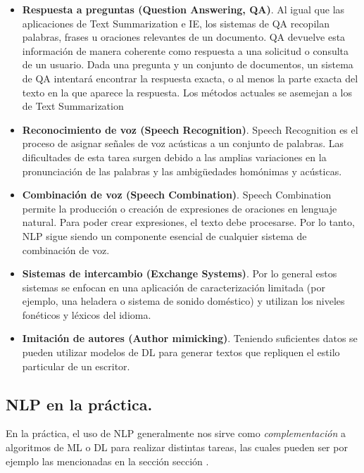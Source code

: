 \documentclass[12pt,a4paper]{article}
\begin{document}
\begin{sloppypar}
\begin{itemize}
\item \textbf{Respuesta a preguntas (Question Answering, QA)}. Al igual que las aplicaciones de Text Summarization e IE, los sistemas de QA recopilan palabras, frases u oraciones relevantes de un documento. QA devuelve esta información de manera coherente como respuesta a una solicitud o consulta de un usuario. Dada una pregunta y un conjunto de documentos, un sistema de QA intentará encontrar la respuesta exacta, o al menos la parte exacta del texto en la que aparece la respuesta. Los métodos actuales se asemejan a los de Text Summarization

\item \textbf{Reconocimiento de voz (Speech Recognition)}. Speech Recognition es el proceso de asignar señales de voz acústicas a un conjunto de palabras. Las dificultades de esta tarea surgen debido a las amplias variaciones en la pronunciación de las palabras y las ambigüedades homónimas y acústicas.

\item \textbf{Combinación de voz (Speech Combination)}. Speech Combination permite la producción o creación de expresiones de oraciones en lenguaje natural. Para poder crear expresiones, el texto debe procesarse. Por lo tanto, NLP sigue siendo un componente esencial de cualquier sistema de combinación de voz.

\item \textbf{Sistemas de intercambio (Exchange Systems)}. Por lo general estos sistemas se enfocan en una aplicación de caracterización limitada (por ejemplo, una heladera o sistema de sonido doméstico) y utilizan los niveles fonéticos y léxicos del idioma. 

\item \textbf{Imitación de autores (Author mimicking)}. Teniendo suficientes datos se pueden utilizar modelos de DL para generar textos que repliquen el estilo particular de un escritor.
\end{itemize}

\cleardoublepage

\subsection{NLP en la práctica.}\label{Practica_NLP}

En la práctica, el uso de NLP generalmente nos sirve como \textit{complementación} a algoritmos de ML o DL para realizar distintas tareas, las cuales pueden ser por ejemplo las mencionadas en la sección sección \textit{}.


\end{sloppypar}
\end{document}
